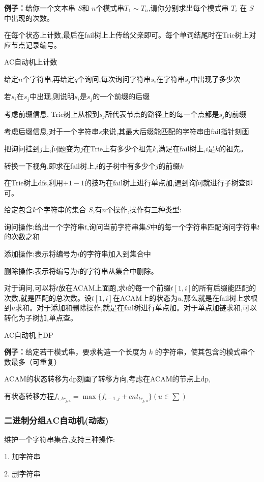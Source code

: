\documentclass[a4paper, fontset=none]{ctexart}
\begin{document}
\textbf{例子：}给你一个文本串 $S$和 $n$个模式串$T_1 \sim T_n$,请你分别求出每个模式串 $T_i$ 在 $S$中出现的次数。

在每个状态上计数,最后在fail树上上传给父亲即可。每个单词结尾时在Trie树上对应节点记录编号。

AC自动机上计数

给定$n$个字符串,再给定$q$个询问,每次询问字符串$s_i$在字符串$s_j$中出现了多少次

若$s_i$在$s_j$中出现,则说明$s_i$是$s_j$的一个前缀的后缀

考虑前缀信息, Trie树上从根到$s_j$所代表节点的路径上的每一个点都是$s_j$的前缀

考虑后缀信息,对于一个字符串$s$来说,其最大后缀能匹配的字符串由fail指针刻画

把询问挂到$j$上,问题变为$j$在Trie上有多少个祖先$k$,满足在fail树上,$i$是$k$的祖先。

转换一下视角,即求在fail树上,$i$的子树中有多少个$j$的前缀$k$

在Trie树上dfs,利用$+1 -1$的技巧在fail树上进行单点加,遇到询问就进行子树查即可。

给定包含$k$个字符串的集合 $S$,有$n$个操作,操作有三种类型:

询问操作:给出一个字符串$t$,询问当前字符串集$S$中的每一个字符串匹配询问字符串$t$的次数之和

添加操作:表示将编号为$i$的字符串加入到集合中

删除操作:表示将编号为$i$的字符串从集合中删除。

对于询问,可以将$t$放在ACAM上面跑,求$t$的每一个前缀$t[1, i]$的所有后缀能匹配的次数,就是匹配的总次数。设$t[1, i]$在ACAM上的状态为$u$,那么就是在fail树上求根到$u$求和。对于添加和删除操作,就是在fail树进行单点加。对于单点加链求和,可以转化为子树加,单点查。

AC自动机上DP

\textbf{例子：}给定若干模式串，要求构造一个长度为 $k$ 的字符串，使其包含的模式串个数最多（可重复）

ACAM的状态转移为dp刻画了转移方向,考虑在ACAM的节点上dp,

有状态转移方程$f_{i, tr_{j, u}}=\max\{f_{i-1, j}+cnt_{tr_{j, u}}\}(u\in \sum)$
\subsubsection{二进制分组AC自动机(动态)}

维护一个字符串集合,支持三种操作:

1. 加字符串

2. 删字符串
\end{document}
